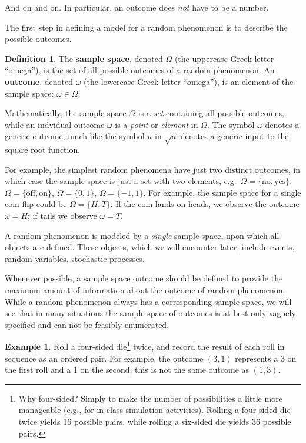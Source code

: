 \documentclass[
]{book}
\theoremstyle{definition}
\newtheorem{definition}{Definition}[chapter]
\theoremstyle{definition}
\newtheorem{example}{Example}[chapter]
\theoremstyle{definition}
\theoremstyle{remark}
\begin{document}
And on and on. In particular, an outcome does \emph{not} have to be a number.

The first step in defining a model for a random phenomenon is to describe the possible outcomes.

\begin{definition}
\protect\hypertarget{def:sample-space}{}{\label{def:sample-space} }
The \textbf{sample space}, denoted \(\Omega\) (the uppercase Greek letter ``omega''), is the set of all possible
outcomes of a random phenomenon. An \textbf{outcome}, denoted \(\omega\) (the lowercase Greek letter ``omega''), is an element of the sample space: \(\omega\in\Omega\).
\end{definition}

Mathematically, the sample space \(\Omega\) is a \emph{set} containing all possible outcomes, while an indvidual outcome \(\omega\) is a \emph{point} or \emph{element} in \(\Omega\). The symbol \(\omega\) denotes a generic outcome, much like the symbol \(u\) in \(\sqrt{u}\) denotes a generic input to the square root function.

For example, the simplest random phenomena have just two distinct outcomes, in which case the sample space is just a set with two elements, e.g.~\(\Omega=\{\text{no}, \text{yes}\}\), \(\Omega=\{\text{off}, \text{on}\}\), \(\Omega=\{0, 1\}\), \(\Omega=\{-1, 1\}\). For example, the sample space for a single coin flip could be \(\Omega = \{H, T\}\). If the coin lands on heads, we observe the outcome \(\omega = H\); if tails we observe \(\omega=T\).

A random phenomenon is modeled by a \emph{single} sample space, upon which all objects are defined. These objects, which we will encounter later, include events, random variables, stochastic processes.

Whenever possible, a sample space outcome should be defined to provide the maximum amount of information about the outcome of random phenomenon. While a random phenomenon always has a corresponding sample space, we will see that in many situations the sample space of outcomes is at best only vaguely specified and can not be feasibly enumerated.

\begin{example}
\protect\hypertarget{exm:dice-outcome}{}{\label{exm:dice-outcome} }
Roll a four-sided die\footnote{Why four-sided? Simply to make the number of possibilities a little more manageable (e.g., for in-class simulation activities). Rolling a four-sided die twice yields 16 possible pairs, while rolling a six-sided die yields 36 possible pairs.} twice, and record the result of each roll in sequence as an ordered pair. For example, the outcome \((3, 1)\) represents a 3 on the first roll and a 1 on the second; this is not the same outcome as \((1, 3)\).
\end{example}
\end{document}
